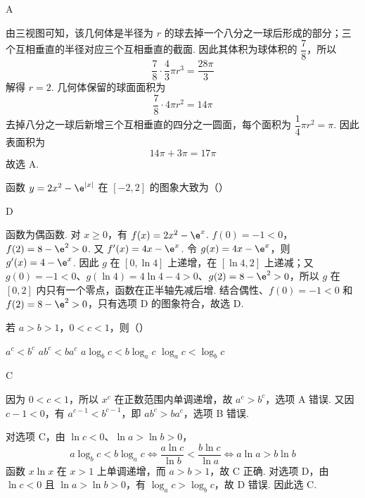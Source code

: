 \begin{answer}
A
\end{answer}

\begin{solution}
由三视图可知，该几何体是半径为 \(r\) 的球去掉一个八分之一球后形成的部分；三个互相垂直的半径对应三个互相垂直的截面. 因此其体积为球体积的 \(\dfrac78\)，所以
\[
\frac78\cdot\frac43\pi r^3=\frac{28\pi}{3}
\]
解得 \(r=2\). 几何体保留的球面面积为
\[
\frac78\cdot4\pi r^2=14\pi
\]
去掉八分之一球后新增三个互相垂直的四分之一圆面，每个面积为 \(\dfrac14\pi r^2=\pi\). 因此表面积为
\[
14\pi+3\pi=17\pi
\]
故选 A.
\end{solution}



\begin{problem}
函数 \(y=2x^2-\e^{|x|}\) 在 \([-2,2]\) 的图象大致为（\quad）

    {}
    {}
    {}
\end{problem}

\begin{answer}
D
\end{answer}

\begin{solution}
函数为偶函数. 对 \(x\geqslant0\)，有 \(f(x)=2x^2-\e^x\).
\(f(0)=-1<0\)，\(f(2)=8-\e^2>0\).
又 \(f'(x)=4x-\e^x\). 令 \(g(x)=4x-\e^x\)，则 \(g'(x)=4-\e^x\). 因此 \(g\) 在 \([0,\ln4]\) 上递增，在 \([\ln4,2]\) 上递减；又 \(g(0)=-1<0\)、\(g(\ln4)=4\ln4-4>0\)、\(g(2)=8-\e^2>0\)，所以 \(g\) 在 \([0,2]\) 内只有一个零点，函数在正半轴先减后增. 结合偶性、\(f(0)=-1<0\) 和 \(f(2)=8-\e^2>0\)，只有选项 D 的图象符合，故选 D.
\end{solution}



\begin{problem}
若 \(a>b>1\)，\(0<c<1\)，则（\quad）

\choices
    {\(a^c<b^c\)}
    {\(ab^c<ba^c\)}
    {\(a\log_b c<b\log_a c\)}
    {\(\log_a c<\log_b c\)}
\end{problem}

\begin{answer}
C
\end{answer}

\begin{solution}
因为 \(0<c<1\)，所以 \(x^c\) 在正数范围内单调递增，故 \(a^c>b^c\)，选项 A 错误. 又因 \(c-1<0\)，有 \(a^{c-1}<b^{c-1}\)，即 \(ab^c>ba^c\)，选项 B 错误.

对选项 C，由 \(\ln c<0\)、\(\ln a>\ln b>0\)，
\[
a\log_b c<b\log_a c
\Longleftrightarrow
\frac{a\ln c}{\ln b}<\frac{b\ln c}{\ln a}
\Longleftrightarrow a\ln a>b\ln b
\]
函数 \(x\ln x\) 在 \(x>1\) 上单调递增，而 \(a>b>1\)，故 C 正确. 对选项 D，由 \(\ln c<0\) 且 \(\ln a>\ln b>0\)，有 \(\log_a c>\log_b c\)，故 D 错误. 因此选 C.
\end{solution}



